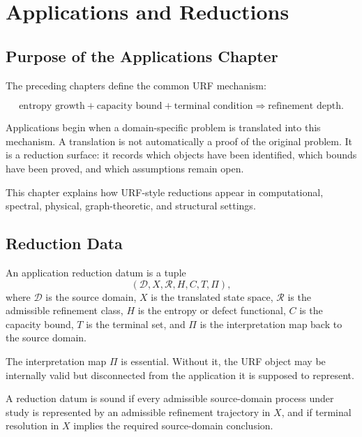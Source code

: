 \chapter{Applications and Reductions}

\section{Purpose of the Applications Chapter}

The preceding chapters define the common URF mechanism:

\[
\text{entropy growth}
+
\text{capacity bound}
+
\text{terminal condition}
\Longrightarrow
\text{refinement depth}.
\]

Applications begin when a domain-specific problem is translated into this
mechanism. A translation is not automatically a proof of the original problem.
It is a reduction surface: it records which objects have been identified, which
bounds have been proved, and which assumptions remain open.

This chapter explains how URF-style reductions appear in computational,
spectral, physical, graph-theoretic, and structural settings.

\section{Reduction Data}

\begin{definition}
An application reduction datum is a tuple
\[
(\mathcal D,X,\mathcal R,H,C,T,\Pi),
\]
where \(\mathcal D\) is the source domain, \(X\) is the translated state space,
\(\mathcal R\) is the admissible refinement class, \(H\) is the entropy or
defect functional, \(C\) is the capacity bound, \(T\) is the terminal set, and
\(\Pi\) is the interpretation map back to the source domain.
\end{definition}

The interpretation map \(\Pi\) is essential. Without it, the URF object may be
internally valid but disconnected from the application it is supposed to
represent.

\begin{definition}
A reduction datum is sound if every admissible source-domain process under
study is represented by an admissible refinement trajectory in \(X\), and if
terminal resolution in \(X\) implies the required source-domain conclusion.
\end{definition}

